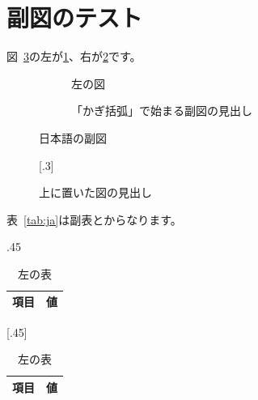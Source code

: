 \expandafter\documentclass\expandafter[\CLSOPT]{\CLS}
\begin{document}
\section*{副図のテスト}


図~\ref{fig:ja}の左が\ref{fig:ja-a}、右が\ref{fig:ja-b}です。

\begin{figure}[htbp]
  \centering
  \begin{subfigure}{.45\linewidth}
    \centering\SCLimage{3cm}{2cm}
    \caption{左の図}\label{fig:ja-a}
  \end{subfigure}\hfill
  \begin{subfigure}{.45\linewidth}
    \centering\SCLimage{3cm}{2cm}
    \caption{「かぎ括弧」で始まる副図の見出し}\label{fig:ja-b}
  \end{subfigure}
  \caption{日本語の副図}\label{fig:ja}
\end{figure}

\begin{figure}[htbp]
  \centering
  \caption{上に置いた図の見出し}
  [.3\linewidth]{%
    \SCLimage{3cm}{2cm}}\hfill
\end{figure}

表~\ref{tab:ja}は副表とからなります。

\begin{table}[htbp]
  \centering
  \caption{日本語の副表}\label{tab:ja}
  \begin{subtable}{.45\linewidth}
    \centering
    \caption{左の表}\label{tab:ja-a}
    \begin{tabular}{ll}\hline 項目 & 値\\\hline\end{tabular}
  \end{subtable}\hfill
  [.45\linewidth]{%
    \begin{tabular}{ll}\hline 項目 & 値\\\hline\end{tabular}}
\end{table}
\end{document}
